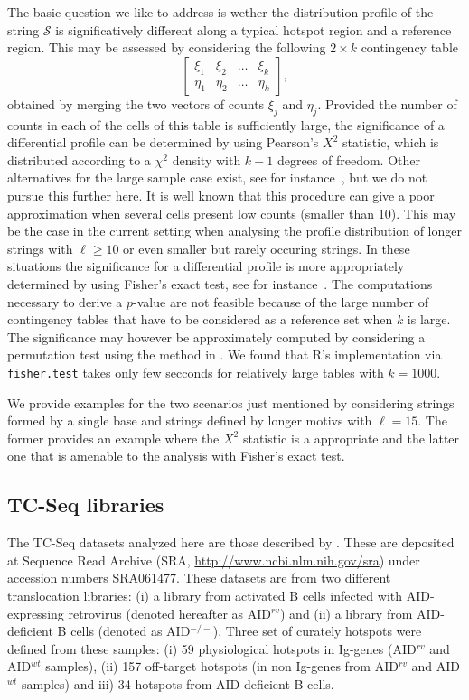 \documentclass{bioinfo}
\begin{document}
The basic question we like to address is wether the distribution
profile of the string $\mathcal S$ is significatively different along
a typical hotspot region and a reference region. This may be assessed
by considering the following $2\times k$ contingency table 
\[
  \begin{bmatrix}
  \xi_1 & \xi_2 & \ldots & \xi_k\\
  \eta_1 & \eta_2 & \ldots & \eta_k
  \end{bmatrix},
\]
obtained by merging the two vectors of counts $\xi_j$ and
$\eta_j$. Provided the number of counts in each of the cells of this
table is sufficiently large, the significance of a differential
profile can be determined by using Pearson's $X^2$ statistic, which is
distributed according to a $\chi^2$ density with $k-1$ degrees of
freedom. Other alternatives for the large sample case exist, see for
instance~\cite{RC}, but we do not pursue this further here.  It is
well known that this procedure can give a poor approximation when
several cells present low counts (smaller than 10). This may be the
case in the current setting when analysing the profile distribution of
longer strings with $\ell \geq 10$ or even smaller but rarely occuring
strings. In these situations the significance for a differential
profile is more appropriately determined by using Fisher's exact test,
see for instance~\cite{A}. The computations necessary to derive a
$p$-value are not feasible because of the large number of contingency
tables that have to be considered as a reference set when $k$ is
large. The significance may however be approximately computed by
considering a permutation test using the method in \cite{P}. We found
that R's implementation via \texttt{fisher.test} takes only few
secconds for relatively large tables with $k=1000$. 

We provide examples for the two scenarios just mentioned by
considering strings formed by a single base and strings defined by
longer motivs with $\ell = 15$. The former provides an example where
the $X^2$ statistic is a appropriate and the latter one that is
amenable to the analysis with Fisher's exact test. 


\subsection{TC-Seq libraries}\label{methods:tcseqhs}
The TC-Seq datasets analyzed here are those described by
\cite{pmid21962510}. These are deposited at Sequence Read Archive
(SRA, \url{http://www.ncbi.nlm.nih.gov/sra}) under accession numbers 
SRA061477. These datasets are from two different translocation
libraries: (i) a library from activated B cells infected with
AID-expressing retrovirus (denoted hereafter as AID$^{rv}$) and (ii) a
library from AID-deficient B cells (denoted as AID$^{-/-}$). Three set
of curately hotspots were defined from these samples: (i) 59
physiological hotspots in Ig-genes (AID$^{rv}$ and  AID$^{wt}$
samples), (ii) 157 off-target hotspots (in non Ig-genes from
AID$^{rv}$ and  AID$^{wt}$ samples) and iii) 34 hotspots from
AID-deficient B cells. 
\end{document}
